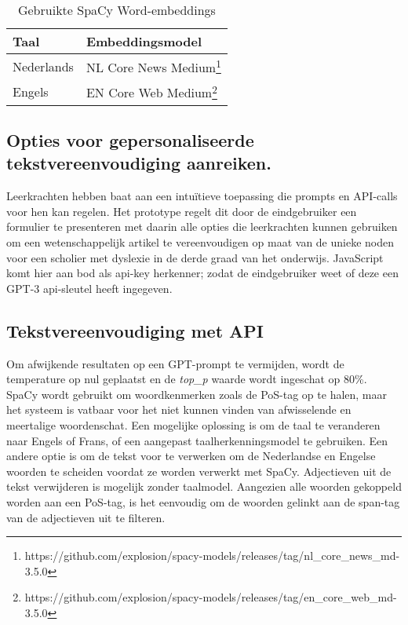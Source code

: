 \begin{center}
	\begin{table}
	\begin{tabular}{ | m{4cm} | m{12cm} | } 
		\hline
		\textbf{Taal} & \textbf{Embeddingsmodel} \\
		\hline
		Nederlands & NL Core News Medium\footnote{https://github.com/explosion/spacy-models/releases/tag/nl_core_news_md-3.5.0} \\ 
		\hline
		Engels & EN Core Web Medium\footnote{https://github.com/explosion/spacy-models/releases/tag/en_core_web_md-3.5.0} \\
		\hline
	\end{tabular}
	\label{table:wordembeddings-spacy}
	\caption{Gebruikte SpaCy Word-embeddings}
	\end{table}

\end{center}

\subsection{Opties voor gepersonaliseerde tekstvereenvoudiging aanreiken.}

Leerkrachten hebben baat aan een intuïtieve toepassing die prompts en API-calls voor hen kan regelen. Het prototype regelt dit door de eindgebruiker een formulier te presenteren met daarin alle opties die leerkrachten kunnen gebruiken om een wetenschappelijk artikel te vereenvoudigen op maat van de unieke noden voor een scholier met dyslexie in de derde graad van het onderwijs. JavaScript komt hier aan bod als api-key herkenner; zodat de eindgebruiker weet of deze een GPT-3 api-sleutel heeft ingegeven.




\subsection{Tekstvereenvoudiging met API}

Om afwijkende resultaten op een GPT-prompt te vermijden, wordt de temperature op nul geplaatst en de \textit{top\_p} waarde wordt ingeschat op 80\%. SpaCy wordt gebruikt om woordkenmerken zoals de PoS-tag op te halen, maar het systeem is vatbaar voor het niet kunnen vinden van afwisselende en meertalige woordenschat. Een mogelijke oplossing is om de taal te veranderen naar Engels of Frans, of een aangepast taalherkenningsmodel te gebruiken. Een andere optie is om de tekst voor te verwerken om de Nederlandse en Engelse woorden te scheiden voordat ze worden verwerkt met SpaCy. Adjectieven uit de tekst verwijderen is mogelijk zonder taalmodel. Aangezien alle woorden gekoppeld worden aan een PoS-tag, is het eenvoudig om de woorden gelinkt aan de span-tag van de adjectieven uit te filteren.


